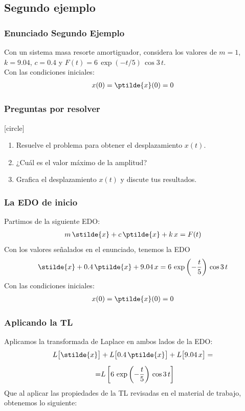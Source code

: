 \subsection{Segundo ejemplo}
\begin{frame}
\frametitle{Enunciado Segundo Ejemplo}
Con un sistema masa resorte amortiguador, considera los valores de $m = 1$, $k = 9.04$, $c= 0.4$ y $F(t) =  6 \, \exp(-t/5) \, \cos 3 \, t$.
\\
\bigskip
Con las condiciones iniciales:
\begin{align*}
x(0) = \ptilde{x}(0) = 0
\end{align*}
\end{frame}
\begin{frame}
\frametitle{Preguntas por resolver}
[circle]
\begin{enumerate}[<+->]
\item Resuelve el problema para obtener el desplazamiento $x(t)$.
\item ¿Cuál es el valor máximo de la amplitud?
\item Grafica el desplazamiento $x(t)$ y discute tus resultados.
\end{enumerate}
\end{frame}
\begin{frame}
\frametitle{La EDO de inicio}
Partimos de la siguiente EDO:
\begin{align*}
m \, \stilde{x} + c \, \ptilde{x} + k \, x = F(t)
\end{align*}
\pause
Con los valores señalados en el enunciado, tenemos la EDO
\begin{align*}
\stilde{x} + 0.4 \, \ptilde{x} + 9.04 \, x = 6 \, \exp\left( -\dfrac{t}{5}\right) \, \cos 3 \, t
\end{align*}
Con las condiciones iniciales:
\begin{align*}
x(0) = \ptilde{x}(0) = 0
\end{align*}
\end{frame}
\begin{frame}
\frametitle{Aplicando la TL}
Aplicamos la transformada de Laplace en ambos lados de la EDO:
\begin{align*}
L \big[\stilde{x}\big] &+ L\big[0.4 \, \ptilde{x}\big] + L \big[9.04 \, x\big] = \\[0.5em]
=& L \left[ 6 \, \exp \left( -\dfrac{t}{5}\right) \, \cos 3 \, t \right]
\end{align*}
\pause
Que al aplicar las propiedades de la TL revisadas en el material de trabajo, obtenemos lo siguiente:
\end{frame}

